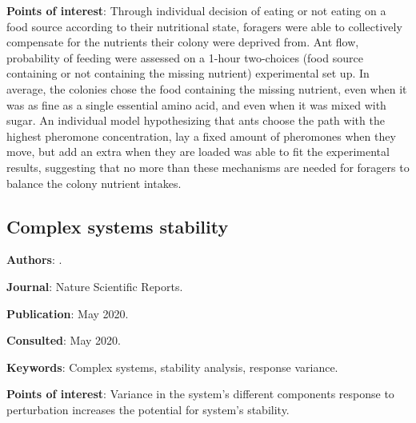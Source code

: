 \documentclass[12pt,a4paper]{article}
\begin{document}
\textbf{Points of interest}: Through individual decision of eating or not eating on a food source according to their nutritional state, foragers were able to collectively compensate for the nutrients their colony were deprived from. Ant flow, probability of feeding were assessed on a 1-hour two-choices (food source containing or not containing the missing nutrient) experimental set up. In average, the colonies chose the food containing the missing nutrient, even when it was as fine as a single essential amino acid, and even when it was mixed with sugar. An individual model hypothesizing that ants choose the path with the highest pheromone concentration, lay a fixed amount of pheromones when they move, but add an extra when they are loaded was able to fit the experimental results, suggesting that no more than these mechanisms are needed for foragers to balance the colony nutrient intakes. 

\newpage

\subsection*{Complex systems stability}

\textbf{Authors}: \cite{duthie2020component}.

\textbf{Journal}: Nature Scientific Reports.

\textbf{Publication}: May 2020.

\textbf{Consulted}: May 2020.

\textbf{Keywords}: Complex systems, stability analysis, response variance.

\textbf{Points of interest}: Variance in the system's different components response to perturbation increases the potential for system's stability.

\newpage

\newpage

\nocite{*}
\end{document}
